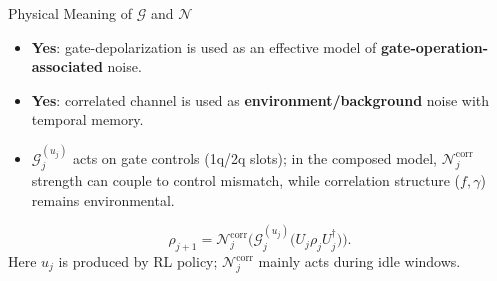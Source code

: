 \documentclass[10pt,aspectratio=169]{beamer}
\begin{document}
\begin{frame}{Physical Meaning of \texorpdfstring{$\mathcal{G}$}{G} and \texorpdfstring{$\mathcal{N}$}{N}}
  \small
  \begin{itemize}
    \item \textbf{Yes}: gate-depolarization is used as an effective model of \textbf{gate-operation-associated} noise.
    \item \textbf{Yes}: correlated channel is used as \textbf{environment/background} noise with temporal memory.
    \item \(\mathcal{G}^{(u_j)}_j\) acts on gate controls (1q/2q slots); in the composed model, \(\mathcal{N}^{\mathrm{corr}}_j\) strength can couple to control mismatch, while correlation structure (\(f,\gamma\)) remains environmental.
  \end{itemize}
  \vspace{0.3em}
  \[
    \rho_{j+1}
    =
    \mathcal{N}^{\mathrm{corr}}_j
    \!\Big(
    \mathcal{G}^{(u_j)}_j
    \!\big(U_j\rho_j U_j^\dagger\big)\Big).
  \]
  \small
  Here \(u_j\) is produced by RL policy; \(\mathcal{N}^{\mathrm{corr}}_j\) mainly acts during idle windows.
\end{frame}
\end{document}
